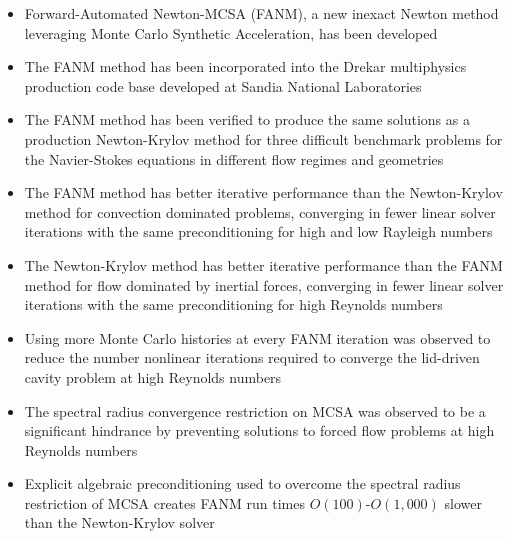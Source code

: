 \begin{itemize}
\item Forward-Automated Newton-MCSA (FANM), a new inexact Newton
  method leveraging Monte Carlo Synthetic Acceleration, has been
  developed
\item The FANM method has been incorporated into the Drekar
  multiphysics production code base developed at Sandia National
  Laboratories
\item The FANM method has been verified to produce the same solutions
  as a production Newton-Krylov method for three difficult benchmark
  problems for the Navier-Stokes equations in different flow regimes
  and geometries
\item The FANM method has better iterative performance than the
  Newton-Krylov method for convection dominated problems, converging
  in fewer linear solver iterations with the same preconditioning for
  high and low Rayleigh numbers
\item The Newton-Krylov method has better iterative performance than
  the FANM method for flow dominated by inertial forces, converging in
  fewer linear solver iterations with the same preconditioning for
  high Reynolds numbers
\item Using more Monte Carlo histories at every FANM iteration was
  observed to reduce the number nonlinear iterations required to
  converge the lid-driven cavity problem at high Reynolds numbers
\item The spectral radius convergence restriction on MCSA was observed
  to be a significant hindrance by preventing solutions to forced flow
  problems at high Reynolds numbers
\item Explicit algebraic preconditioning used to overcome the spectral
  radius restriction of MCSA creates FANM run times
  $O(100)$-$O(1,000)$ slower than the Newton-Krylov solver
\end{itemize}

